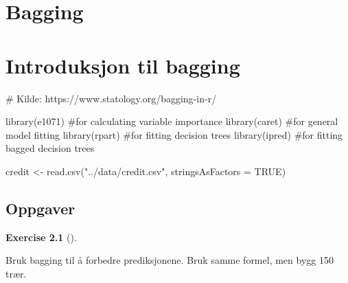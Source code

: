 \documentclass[
  letterpaper,
  DIV=11,
  numbers=noendperiod]{scrreprt}
\newenvironment{Shaded}{\begin{snugshade}}{\end{snugshade}}
\newcommand{\AttributeTok}[1]{\textcolor[rgb]{0.40,0.45,0.13}{#1}}
\newcommand{\CommentTok}[1]{\textcolor[rgb]{0.37,0.37,0.37}{#1}}
\newcommand{\ConstantTok}[1]{\textcolor[rgb]{0.56,0.35,0.01}{#1}}
\newcommand{\FunctionTok}[1]{\textcolor[rgb]{0.28,0.35,0.67}{#1}}
\newcommand{\NormalTok}[1]{\textcolor[rgb]{0.00,0.23,0.31}{#1}}
\newcommand{\OtherTok}[1]{\textcolor[rgb]{0.00,0.23,0.31}{#1}}
\newcommand{\StringTok}[1]{\textcolor[rgb]{0.13,0.47,0.30}{#1}}
\theoremstyle{definition}
\newtheorem{exercise}{Exercise}[chapter]
\theoremstyle{remark}
\begin{document}

\hypertarget{bagging}{%
\chapter{Bagging}\label{bagging}}


\hypertarget{introduksjon-til-bagging}{%
\chapter{Introduksjon til bagging}\label{introduksjon-til-bagging}}

\begin{Shaded}
\begin{Highlighting}[]
\CommentTok{\# Kilde: https://www.statology.org/bagging{-}in{-}r/ }

\FunctionTok{library}\NormalTok{(e1071)       }\CommentTok{\#for calculating variable importance}
\FunctionTok{library}\NormalTok{(caret)       }\CommentTok{\#for general model fitting}
\FunctionTok{library}\NormalTok{(rpart)       }\CommentTok{\#for fitting decision trees}
\FunctionTok{library}\NormalTok{(ipred)       }\CommentTok{\#for fitting bagged decision trees}

\NormalTok{credit }\OtherTok{\textless{}{-}} \FunctionTok{read.csv}\NormalTok{(}\StringTok{"../data/credit.csv"}\NormalTok{, }\AttributeTok{stringsAsFactors =} \ConstantTok{TRUE}\NormalTok{) }
\end{Highlighting}
\end{Shaded}

\hypertarget{oppgaver-4}{%
\section{Oppgaver}\label{oppgaver-4}}

\leavevmode{}%
\begin{exercise}[]\label{exr-}

Bruk bagging til å forbedre prediksjonene. Bruk samme formel, men bygg
150 trær.

\end{exercise}
\end{document}
